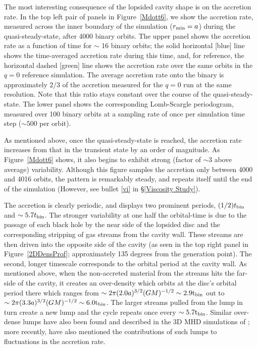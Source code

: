 The most interesting consequence of the lopsided cavity shape is on
the accretion rate.  In the top left pair of panels in
Figure~\ref{Mdott6}, we show the accretion rate, measured across the
inner boundary of the simulation ($r_{\rm min}=a$) during the
quasi-steady-state, after 4000 binary orbits.  The upper panel shows
the accretion rate as a function of time for $\sim$ 16 binary
orbits; the solid horizontal [blue] line shows the time-averaged
accretion rate during this time, and, for reference, the horizontal
dashed [green] line shows the accretion rate over the same orbits in
the $q=0$ reference simulation. The average accretion
rate onto the binary is approximately $2/3$ of the accretion measured 
for the $q=0$ run at the same resolution. Note that this ratio stays constant 
over the course of the quasi-steady-state.
The lower panel shows the corresponding Lomb-Scargle periodogram, measured over
100 binary orbits at a sampling rate of once per simulation time step
($\sim 500$ per orbit).

As mentioned above, once the quasi-steady-state is reached, the
accretion rate increases from that in the transient state by an order
of magnitude.  As Figure~\ref{Mdott6} shows, it also begins to exhibit
strong (factor of $\sim 3$ above average) variability.  Although this figure samples
the accretion only between 4000 and 4016 orbits, the pattern is
remarkably steady, and repeats itself until the end of the simulation (However, see bullet \ref{vi} in \S \ref{Viscosity Study}). 


The accretion is clearly periodic, and displays two prominent
periods, $(1/2)t_{\rm bin}$ and $\sim5.7t_{\rm bin}$.  The stronger
variability at one half the orbital-time is due to the passage of each
black hole by the near side of the lopsided disc and the corresponding
stripping of gas streams from the cavity wall. These streams are then
driven into the opposite side of the cavity (as seen in the top right
panel in Figure~\ref{2DDensProf}; approximately 135 degrees from the
generation point).  The second, longer timescale corresponds to the
orbital period at the cavity wall.  As mentioned above, when the
non-accreted material from the streams hits the far-side of the
cavity, it creates an over-density which orbits at the disc's
orbital period there which ranges from $\sim 2 \pi (2.0a)^{3/2} (GM)^{-1/2} \sim
2.9\rm{t}_{\rm{bin}}$ out to $\sim2 \pi (3.3a)^{3/2} (GM)^{-1/2} \sim
6.0\rm{t}_{\rm{bin}}$. The larger streams pulled from the lump in turn create 
a new lump and the cycle repeats once every $\sim 5.7 \rm{t}_{\rm{bin}}$.
Similar over-dense lumps have also been found
and described in the 3D MHD simulations of \cite{ShiKrolik:2012}; more
recently, \cite{Roedig:2011:eccevo, Roedig:2012:Trqs} have also mentioned the
contributions of such lumps to fluctuations in the accretion rate.



